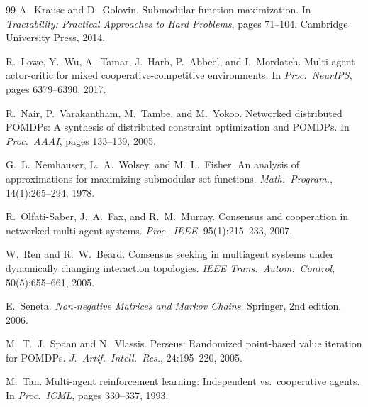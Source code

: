 \documentclass[12pt,oneside]{report}
\theoremstyle{definition}
\theoremstyle{remark}
\begin{document}
\begin{thebibliography}{99}
A.\ Krause and D.\ Golovin.
\newblock Submodular function maximization.
\newblock In \textit{Tractability: Practical Approaches to Hard Problems},
  pages 71--104. Cambridge University Press, 2014.

R.\ Lowe, Y.\ Wu, A.\ Tamar, J.\ Harb, P.\ Abbeel, and I.\ Mordatch.
\newblock Multi-agent actor-critic for mixed cooperative-competitive environments.
\newblock In \textit{Proc.\ NeurIPS}, pages 6379--6390, 2017.

R.\ Nair, P.\ Varakantham, M.\ Tambe, and M.\ Yokoo.
\newblock Networked distributed POMDPs: A synthesis of distributed constraint
  optimization and POMDPs.
\newblock In \textit{Proc.\ AAAI}, pages 133--139, 2005.

G.\ L.\ Nemhauser, L.\ A.\ Wolsey, and M.\ L.\ Fisher.
\newblock An analysis of approximations for maximizing submodular set functions.
\newblock \textit{Math.\ Program.}, 14(1):265--294, 1978.

R.\ Olfati-Saber, J.\ A.\ Fax, and R.\ M.\ Murray.
\newblock Consensus and cooperation in networked multi-agent systems.
\newblock \textit{Proc.\ IEEE}, 95(1):215--233, 2007.

W.\ Ren and R.\ W.\ Beard.
\newblock Consensus seeking in multiagent systems under dynamically changing
  interaction topologies.
\newblock \textit{IEEE Trans.\ Autom.\ Control}, 50(5):655--661, 2005.

E.\ Seneta.
\newblock \textit{Non-negative Matrices and Markov Chains}.
\newblock Springer, 2nd edition, 2006.

M.\ T.\ J.\ Spaan and N.\ Vlassis.
\newblock Perseus: Randomized point-based value iteration for POMDPs.
\newblock \textit{J.\ Artif.\ Intell.\ Res.}, 24:195--220, 2005.

M.\ Tan.
\newblock Multi-agent reinforcement learning: Independent vs.\ cooperative agents.
\newblock In \textit{Proc.\ ICML}, pages 330--337, 1993.

\end{thebibliography}

\end{document}
